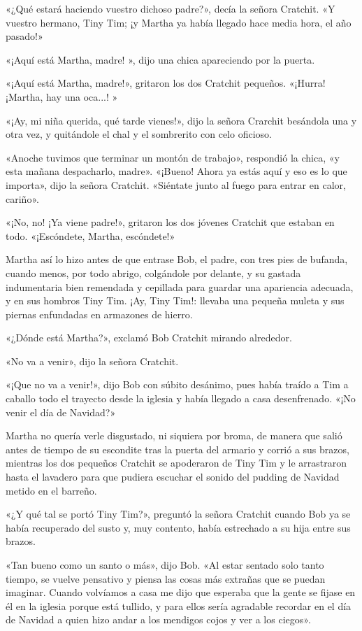 \documentclass{novela}
\begin{document}
 «¿Qué estará haciendo vuestro dichoso padre?», decía la señora Cratchit. «Y vuestro hermano, Tiny Tim; ¡y Martha ya había llegado hace media hora, el año pasado!»

 «¡Aquí está Martha, madre! », dijo una chica apareciendo por la puerta.

 «¡Aquí está Martha, madre!», gritaron los dos Cratchit pequeños. «¡Hurra! ¡Martha, hay una oca...! »

 «¡Ay, mi niña querida, qué tarde vienes!», dijo la señora Crarchit besándola una y otra vez, y quitándole el chal y el sombrerito con celo oficioso.

 «Anoche tuvimos que terminar un montón de trabajo», respondió la chica, «y esta mañana despacharlo, madre». «¡Bueno! Ahora ya estás aquí y eso es lo que importa», dijo la señora Cratchit. «Siéntate junto al fuego para entrar en calor, cariño».

 «¡No, no! ¡Ya viene padre!», gritaron los dos jóvenes Cratchit que estaban en todo. «¡Escóndete, Martha, escóndete!»

 Martha así lo hizo antes de que entrase Bob, el padre, con tres pies de bufanda, cuando menos, por todo abrigo, colgándole por delante, y su gastada indumentaria bien remendada y cepillada para guardar una apariencia adecuada, y en sus hombros Tiny Tim. ¡Ay, Tiny Tim!: llevaba una pequeña muleta y sus piernas enfundadas en armazones de hierro.

 «¿Dónde está Martha?», exclamó Bob Cratchit mirando alrededor.

 «No va a venir», dijo la señora Cratchit.

 «¡Que no va a venir!», dijo Bob con súbito desánimo, pues había traído a Tim a caballo todo el trayecto desde la iglesia y había llegado a casa desenfrenado. «¡No venir el día de Navidad?»

 Martha no quería verle disgustado, ni siquiera por broma, de manera que salió antes de tiempo de su escondite tras la puerta del armario y corrió a sus brazos, mientras los dos pequeños Cratchit se apoderaron de Tiny Tim y le arrastraron hasta el lavadero para que pudiera escuchar el sonido del pudding de Navidad metido en el barreño.

 «¿Y qué tal se portó Tiny Tim?», preguntó la señora Cratchit cuando Bob ya se había recuperado del susto y, muy contento, había estrechado a su hija entre sus brazos.

 «Tan bueno como un santo o más», dijo Bob. «Al estar sentado solo tanto tiempo, se vuelve pensativo y piensa las cosas más extrañas que se puedan imaginar. Cuando volvíamos a casa me dijo que esperaba que la gente se fijase en él en la iglesia porque está tullido, y para ellos sería agradable recordar en el día de Navidad a quien hizo andar a los mendigos cojos y ver a los ciegos».
\end{document}
